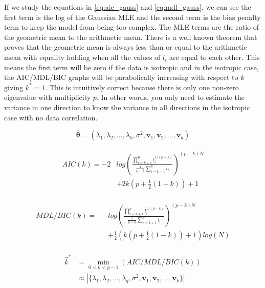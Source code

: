\documentclass[journal]{IEEEtran}
\begin{document}
\par If we study the equations in \ref{eq:aic_gauss} and \ref{eq:mdl_gauss}, we can see the first term is the log of the Gaussian MLE and the second term is the bias penalty term to keep the model from being too complex. The MLE terms are the ratio of the geometric mean to the arithmetic mean. There is a well known theorem that proves that the geometric mean is always less than or equal to the arithmetic mean with equality holding when all the values of \(l_i\) are equal to each other.  This means the first term will be zero if the data is isotropic and in the isotropic case, the AIC/MDL/BIC graphs will be parabolically increasing with respect to \(k\) giving \(k^*=1\). This is intuitively correct because there is only one non-zero eigenvalue with multiplicity \(p\). In other words, you only need to estimate the variance in one direction to know the variance in all directions in the isotropic case with no data correlation.

\begin{equation}
\label{eq:numparams}
\bm{\hat{\theta}} = (\lambda_1, \lambda_2, \dots, \lambda_k, \sigma^2, \bm{v}_1, \bm{v}_2, \dots, \bm{v}_k)
\end{equation}

\begin{align}
\begin{split}
\label{eq:aic_gauss}
AIC(k) = -2 &log\left(\frac{\prod_{i=k+1}^{p}l_i^{1/(p-k)}}{\frac{1}{p-k}\sum_{i = k+1}^{p}l_i} \right)^{(p-k)N} \\
       &+ 2k(p+\frac{1}{2}(1-k)) + 1
\end{split}
\end{align}

\begin{align}
\begin{split}
\label{eq:mdl_gauss}
MDL/BIC(k) = - &log\left(\frac{\prod_{i=k+1}^{p}l_i^{1/(p-k)}}{\frac{1}{p-k}\sum_{i = k+1}^{p}l_i} \right)^{(p-k)N} \\
       &+ \frac{1}{2} (k(p+\frac{1}{2}(1-k))+1)log(N)
\end{split}
\end{align}

\begin{align}
\begin{split}
\label{eq:him}
\hat{k}^* &= \min_{0<k<p-1}(AIC/MDL/BIC(k)) \\
          & \approx |\{\lambda_1, \lambda_2, \dots, \lambda_q, \sigma^2, \bm{v}_1, \bm{v}_2, \dots, \bm{v}_k\}|.
\end{split}
\end{align}
\end{document}

